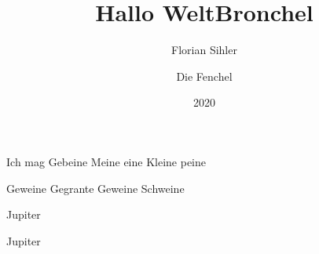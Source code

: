 \documentclass{article}
\begin{document}
\listofpoems[3]

\begin{poem}
\title{Hallo Welt}
\author{Florian Sihler}
\date{2020}
\start
Ich mag Gebeine
Meine eine
Kleine peine

Geweine
Gegrante
Geweine
Schweine
\end{poem}
\begin{poem}
\title{Bronchel}
\author{Die Fenchel}
\start
Jupiter
\end{poem}

\begin{poem}
Jupiter
\end{poem}
\end{document}
